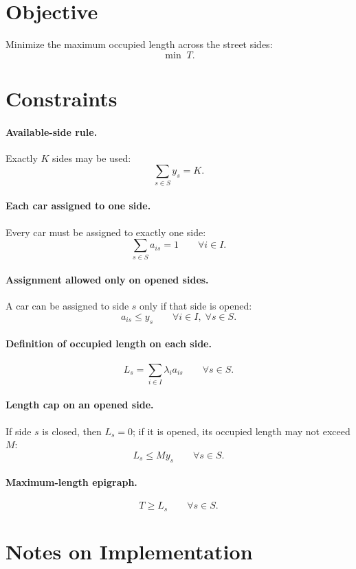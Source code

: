 \section*{Objective}

Minimize the maximum occupied length across the street sides:
\[
\min \; T.
\]

\section*{Constraints}

\paragraph{Available-side rule.}
Exactly \(K\) sides may be used:
\[
\sum_{s \in S} y_s = K.
\]

\paragraph{Each car assigned to one side.}
Every car must be assigned to exactly one side:
\[
\sum_{s \in S} a_{is} = 1 \qquad \forall i \in I.
\]

\paragraph{Assignment allowed only on opened sides.}
A car can be assigned to side \(s\) only if that side is opened:
\[
a_{is} \le y_s \qquad \forall i \in I,\; \forall s \in S.
\]

\paragraph{Definition of occupied length on each side.}
\[
L_s = \sum_{i \in I} \lambda_i a_{is} \qquad \forall s \in S.
\]

\paragraph{Length cap on an opened side.}
If side \(s\) is closed, then \(L_s=0\); if it is opened, its occupied length may not exceed \(M\):
\[
L_s \le M y_s \qquad \forall s \in S.
\]

\paragraph{Maximum-length epigraph.}
\[
T \ge L_s \qquad \forall s \in S.
\]

\section*{Notes on Implementation}

